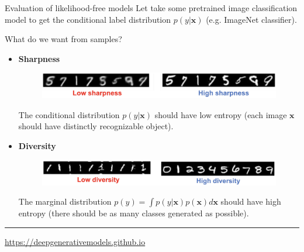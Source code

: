 \documentclass{beamer}
\newcommand{\bx}{\mathbf{x}}
\begin{document}
\begin{frame}{Evaluation of likelihood-free models}
	Let take some pretrained image classification model to get the conditional label distribution $p(y | \bx)$ (e.g. ImageNet classifier).
	\begin{block}{What do we want from samples?}
		\begin{itemize}
			\item \textbf{Sharpness}
			\begin{figure}
				\centering
				\includegraphics[width=0.9\linewidth]{figs/sharpness}
			\end{figure}
			The conditional distribution $p(y | \bx)$ should have low entropy (each image $\bx$ should have distinctly recognizable object).
			\item \textbf{Diversity}
			\begin{figure}
				\centering
				\includegraphics[width=0.9\linewidth]{figs/diversity}
			\end{figure}
			The marginal distribution $p(y) = \int p(y | \bx) p(\bx) d \bx$ should have high entropy (there should be as many classes generated as possible).
		\end{itemize}
	\end{block}
	\vfill
	\hrule\medskip 
	{\scriptsize \href{https://deepgenerativemodels.github.io}{https://deepgenerativemodels.github.io}}
\end{frame}
\end{document}
